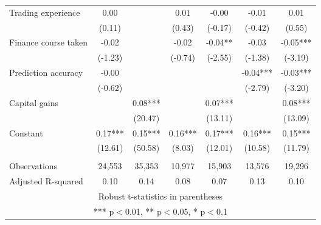 \documentclass[]{article}
\begin{document}
\begin{tabular}{lcccccc}
Trading experience & 0.00 &  & 0.01 & -0.00 & -0.01 & 0.01 \\
 & (0.11) &  & (0.43) & (-0.17) & (-0.42) & (0.55) \\
Finance course taken & -0.02 &  & -0.02 & -0.04** & -0.03 & -0.05*** \\
 & (-1.23) &  & (-0.74) & (-2.55) & (-1.38) & (-3.19) \\
Prediction accuracy & -0.00 &  &  &  & -0.04*** & -0.03*** \\
 & (-0.62) &  &  &  & (-2.79) & (-3.20) \\
Capital gains &  & 0.08*** &  & 0.07*** &  & 0.08*** \\
 &  & (20.47) &  & (13.11) &  & (13.09) \\
Constant & 0.17*** & 0.15*** & 0.16*** & 0.17*** & 0.16*** & 0.15*** \\
 & (12.61) & (50.58) & (8.03) & (12.01) & (10.58) & (11.79) \\
 &  &  &  &  &  &  \\
Observations & 24,553 & 35,353 & 10,977 & 15,903 & 13,576 & 19,296 \\
 Adjusted R-squared & 0.10 & 0.14 & 0.08 & 0.07 & 0.13 & 0.10 \\ \hline
\multicolumn{7}{c}{ Robust t-statistics in parentheses} \\
\multicolumn{7}{c}{ *** p$<$0.01, ** p$<$0.05, * p$<$0.1} \\
\end{tabular}
\end{document}
